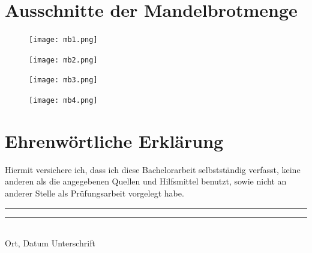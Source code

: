 \documentclass[a4paper,12pt,onesided]{report}
\begin{document}
\chapter{Ausschnitte der Mandelbrotmenge}
\label{chap:mandelpics}
\begin{figure}[H]
	\centering
	\texttt{[image: mb1.png]}
\end{figure}
\begin{figure}[H]
	\centering
	\texttt{[image: mb2.png]}
\end{figure}
\begin{figure}[H]
	\centering
	\texttt{[image: mb3.png]}
\end{figure}
\begin{figure}[H]
	\centering
	\texttt{[image: mb4.png]}
\end{figure}

\chapter{Ehrenwörtliche Erklärung}
Hiermit versichere ich, dass ich diese Bachelorarbeit selbstständig verfasst, keine anderen als die angegebenen Quellen und Hilfsmittel benutzt, sowie nicht an anderer Stelle als Prüfungsarbeit vorgelegt habe.

\vspace{4cm}
\rule[-0.2cm]{6cm}{0.5pt}\hfill
\rule[-0.2cm]{6cm}{0.5pt}\\
\hspace{2cm} Ort, Datum \hfill Unterschrift
\end{document}
